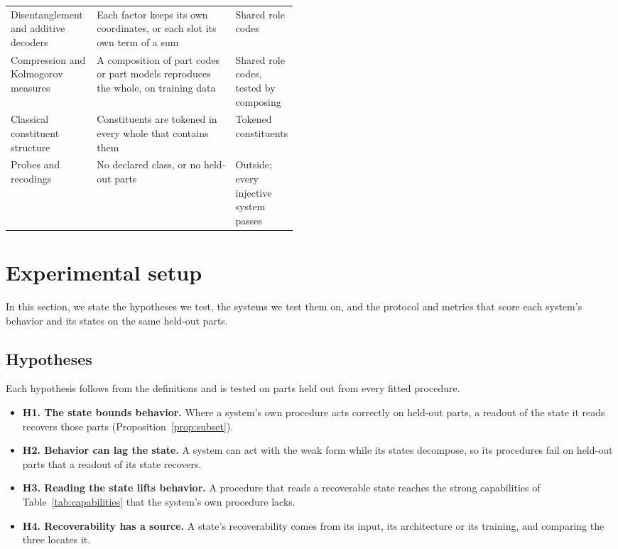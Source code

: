\begin{table}[t]
\begin{tabularx}{\linewidth}{@{}P{0.30\linewidth}YP{0.17\linewidth}@{}}
    Disentanglement and additive decoders \citep{bengio2013,lachapelle2023,wiedemer2024} & Each factor keeps its own coordinates, or each slot its own term of a sum & Shared role codes \\
    Compression and Kolmogorov measures \citep{andreas2019,elmoznino2024,elmoznino2026} & A composition of part codes or part models reproduces the whole, on training data & Shared role codes, tested by composing \\
    \addlinespace
    Classical constituent structure \citep{fodor1988} & Constituents are tokened in every whole that contains them & Tokened constituents \\
    \addlinespace
    Probes \citep{belinkov2022,hewitt2019} and recodings \citep{zadrozny1994} & No declared class, or no held-out parts & Outside; every injective system passes \\
    \bottomrule
  \end{tabularx}
\end{table}

\section{Experimental setup}
\label{sec:experiments}

In this section, we state the hypotheses we test, the systems we test them on, and the protocol and metrics that score each system's behavior and its states on the same held-out parts.

\subsection{Hypotheses}

Each hypothesis follows from the definitions and is tested on parts held out from every fitted procedure.
\begin{itemize}
  \item \textbf{H1. The state bounds behavior.} Where a system's own procedure acts correctly on held-out parts, a readout of the state it reads recovers those parts (Proposition~\ref{prop:subset}).
  \item \textbf{H2. Behavior can lag the state.} A system can act with the weak form while its states decompose, so its procedures fail on held-out parts that a readout of its state recovers.
  \item \textbf{H3. Reading the state lifts behavior.} A procedure that reads a recoverable state reaches the strong capabilities of Table~\ref{tab:capabilities} that the system's own procedure lacks.
  \item \textbf{H4. Recoverability has a source.} A state's recoverability comes from its input, its architecture or its training, and comparing the three locates it.
\end{itemize}

